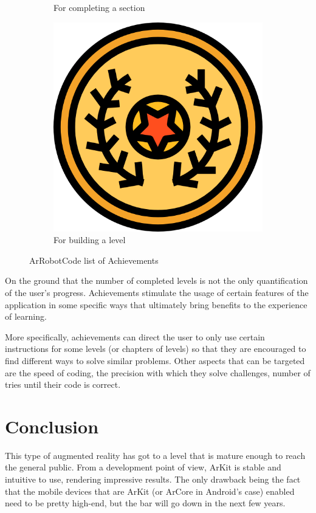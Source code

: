 \documentclass[12 pct]{report}
\begin{document}
\begin{figure}[H]
\begin{subfigure}[b]{0.3\linewidth}
    \caption{For completing a section }
  \end{subfigure}
  \begin{subfigure}[b]{0.3\linewidth}
    \includegraphics[width=\linewidth]{ArRobotCodeAchiv4}
    \caption{For building a level}
  \end{subfigure}
  \caption{ ArRobotCode list of Achievements}
  \label{fig:coffee3}
\end{figure}

On the ground that the number of completed levels is not the only quantification of the user's progress. 
Achievements stimulate the usage of certain features of the application in some specific ways that ultimately bring benefits to the experience of learning.

More specifically, achievements can direct the user to only use certain instructions for some levels (or chapters of levels) so that they are encouraged to find different ways to solve similar problems. 
Other aspects that can be targeted are the speed of coding, the precision with which they solve challenges, number of tries until their code is correct.

\section{Conclusion}
This type of augmented reality has got to a level that is mature enough to reach the general public. From a development point of view, ArKit is stable and intuitive to use, rendering impressive results. The only drawback being the fact that the mobile devices that are ArKit (or ArCore in Android's case) enabled need to be pretty high-end, but the bar will go down in the next few years. 
\end{document}
